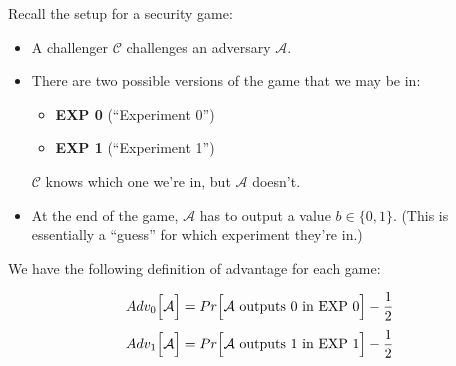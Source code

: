 \documentclass[12pt]{article}
\begin{document}
\begin{figure}
\hfill
{}
\hfill
{}
\hfill
\end{figure}


Recall the setup for a security game:


\begin{itemize}
\item A challenger $\mathcal{C}$ challenges an adversary $\mathcal{A}$.
\item There are two possible versions of the game that we may be in:
\begin{itemize}
\item {\bf EXP 0} (``Experiment 0'')
\item {\bf EXP 1} (``Experiment 1'')
\end{itemize}
$\mathcal{C}$ knows which one we're in, but $\mathcal{A}$ doesn't.

\item At the end of the game, $\mathcal{A}$ has to output a value $b\in \{0, 1\}$. (This is essentially a ``guess'' for which experiment they're in.)
\end{itemize}


We have the following definition of advantage for each game:

$$Adv_0\Big[\mathcal{A}\Big] = Pr\Big[\text{$\mathcal{A}$ outputs $0$ in EXP 0}\Big] - {1 \over 2}$$
$$Adv_1\Big[\mathcal{A}\Big] = Pr\Big[\text{$\mathcal{A}$ outputs $1$ in EXP 1}\Big] - {1 \over 2}$$
\end{document}

